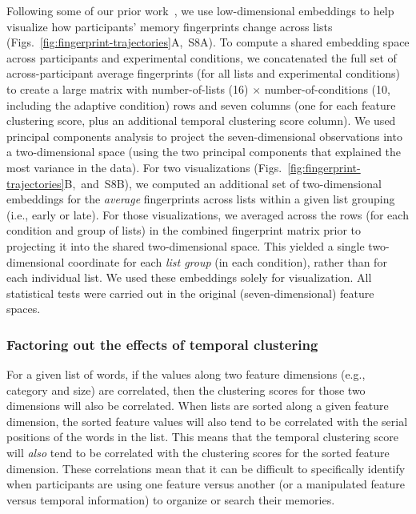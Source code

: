 \documentclass[11pt]{article}
\newcommand{\fingerprintTrajectoryRandom}{S8}
\begin{document}
Following some of our prior work~\citep{HeusEtal18a, HeusEtal21, MannEtal22},
we use low-dimensional embeddings to help visualize how participants' memory
fingerprints change across lists
(Figs.~\ref{fig:fingerprint-trajectories}A,~\fingerprintTrajectoryRandom A). To
compute a shared embedding space across participants and experimental
conditions, we concatenated the full set of across-participant average
fingerprints (for all lists and experimental conditions) to create a large
matrix with number-of-lists (16) $\times$ number-of-conditions (10, including
the adaptive condition) rows and seven columns (one for each feature clustering
score, plus an additional temporal clustering score column). We used principal
components analysis to project the seven-dimensional observations into a
two-dimensional space (using the two principal components that explained the
most variance in the data). For two visualizations
(Figs.~\ref{fig:fingerprint-trajectories}B,~and~\fingerprintTrajectoryRandom B),
we computed an additional set of two-dimensional embeddings for the
\textit{average} fingerprints across lists within a given list grouping (i.e.,
early or late). For those visualizations, we averaged across the rows (for each
condition and group of lists) in the combined fingerprint matrix prior to
projecting it into the shared two-dimensional space. This yielded a single
two-dimensional coordinate for each \textit{list group} (in each condition),
rather than for each individual list. We used these embeddings solely for
visualization. All statistical tests were carried out in the original
(seven-dimensional) feature spaces.

\subsubsection*{Factoring out the effects of temporal clustering}

For a given list of words, if the values along two feature dimensions (e.g.,
category and size) are correlated, then the clustering scores for those two
dimensions will also be correlated. When lists are sorted along a given feature
dimension, the sorted feature values will also tend to be correlated with the
serial positions of the words in the list. This means that the temporal
clustering score will \textit{also} tend to be correlated with the clustering
scores for the sorted feature dimension. These correlations mean that it can be
difficult to specifically identify when participants are using one feature
versus another (or a manipulated feature versus temporal information) to
organize or search their memories.
\end{document}
